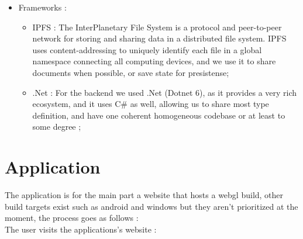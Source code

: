 \begin{itemize}
    \pagebreak
    \item Frameworks : 
          \begin{itemize}
            \item \ac{IPFS} : The InterPlanetary File System is a protocol and peer-to-peer network for storing and sharing data in a distributed file system. IPFS uses content-addressing to uniquely identify each file in a global namespace connecting all computing devices, and we use it to share documents when possible, or save state for presistense;
            \item .Net : For the backend we used .Net (Dotnet 6), as it provides a very rich ecosystem, and it uses C\# as well, allowing us to share most type definition, and have one coherent homogeneous codebase or at least to some degree \cite[p.~9]{3};
          \end{itemize}
  \end{itemize}
  \section{\textnormal{Application}}
  The application is for the main part a website that hosts a webgl build, other build targets exist such as android and windows but they aren't prioritized at the moment, the process goes as follows : \\
  The user visits the applications's website : 
